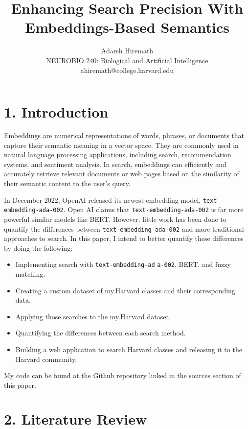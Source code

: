 \documentclass[
	a4paper, %
	10pt, %
	unnumberedsections, %
	twoside, %
]{LTJournalArticle}
\title{Enhancing Search Precision With Embeddings-Based Semantics} %
\author{%
	Adarsh Hiremath \\
	NEUROBIO 240: Biological and Artificial Intelligence \\
	ahiremath@college.harvard.edu
}
\begin{document}
\maketitle %


\section{1. Introduction}

Embeddings are numerical representations of words, phrases, or documents that capture their semantic meaning in a vector space. They are commonly used in natural language processing applications, including search, recommendation systems, and sentiment analysis. In search, embeddings can efficiently and accurately retrieve relevant documents or web pages based on the similarity of their semantic content to the user's query.

In December 2022, OpenAI released its newest embedding model, \texttt{text-embedding-ada-002}. Open AI claims that \texttt{text-embedding-ada-002} is far more powerful similar models like BERT. However, little work has been done to quantify the differences between \texttt{text-embedding-ada-002} and more traditional approaches to search. In this paper, I intend to better quantify these differences by doing the following: 
\begin{itemize}
	\item Implementing search with \texttt{text-embedding-ad}
	\texttt{a-002}, BERT, and fuzzy matching. 
	\item Creating a custom dataset of my.Harvard classes and their corresponding data.
	\item Applying those searches to the my.Harvard dataset.
	\item Quantifying the differences between each search method. 
	\item Building a web application to search Harvard classes and releasing it to the Harvard community. 
\end{itemize}

My code can be found at the Github repository linked in the sources section of this paper. 


\section{2. Literature Review}
\end{document}
